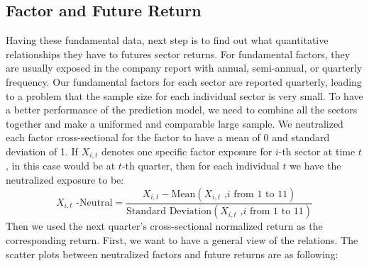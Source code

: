 \documentclass{article}
\begin{document}
\subsection{Factor and Future Return}
Having these fundamental data, next step is to find out what quantitative relationships they have to futures sector returns. For fundamental factors, they are usually exposed in the company report with annual, semi-annual, or quarterly frequency. Our fundamental factors for each sector are reported quarterly, leading to a problem that the sample size for each individual sector is very small. To have a better performance of the prediction model, we need to combine all the sectors together and make a uniformed and comparable large sample. We neutralized each factor cross-sectional for the factor to have a mean of 0 and standard deviation of 1. If $X_{i,t}$ denotes one specific factor exposure for $i$-th sector at time $t$, in this case would be at $t$-th quarter, then for each individual $t$ we have the neutralized exposure to be:
$$X_{i,t}\text{ -Neutral}=\frac{X_{i,t}-\text{Mean}(X_{i,t}\text{  ,}i \text{ from } 1 \text{ to } 11)}{\text{Standard Deviation}(X_{i,t}\text{  ,}i \text{ from } 1 \text{ to } 11)}$$
Then we used the next quarter's cross-sectional normalized return as the corresponding return. First, we want to have a general view of the relations. The scatter plots between neutralized factors and future returns are as following:
\end{document}
